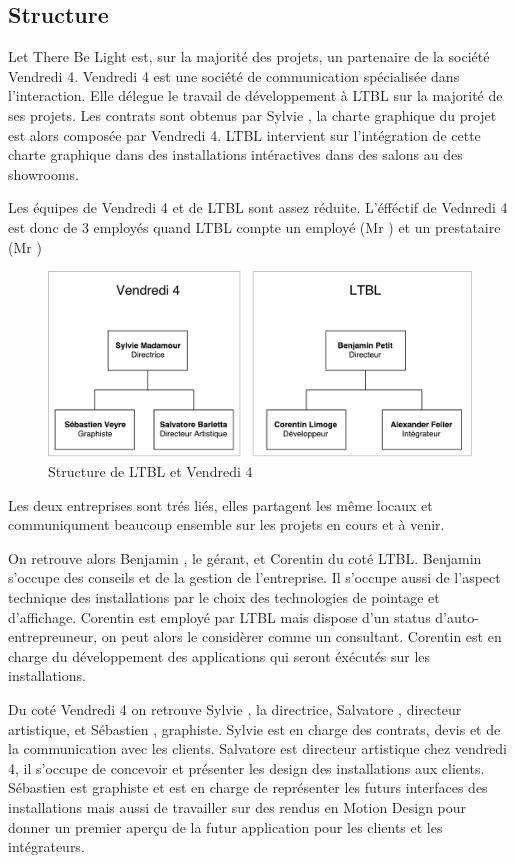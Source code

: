 \documentclass{article}
\begin{document}
\subsection{Structure}

Let There Be Light est, sur la majorité des projets, un partenaire de la société Vendredi 4.
Vendredi 4 est une société de communication spécialisée dans l'interaction.
Elle délegue le travail de développement à LTBL sur la majorité de ses projets.
Les contrats sont obtenus par Sylvie , la charte graphique du projet est alors composée par Vendredi 4.
LTBL intervient sur l'intégration de cette charte graphique dans des installations intéractives dans des salons au des showrooms.

Les équipes de Vendredi 4 et de LTBL sont assez réduite.
L'éfféctif de Vednredi 4 est donc de 3 employés quand LTBL compte un employé (Mr ) et un prestataire (Mr )

\begin{figure}[h]
    \centering
    \includegraphics[scale=0.7]{Structure-LTBL.pdf}
    \caption{Structure de LTBL et Vendredi 4}
\end{figure}

Les deux entreprises sont trés liés, elles partagent les même locaux et communiqument beaucoup ensemble sur les projets en cours et à venir.

On retrouve alors Benjamin , le gérant, et Corentin  du coté LTBL.
Benjamin s'occupe des conseils et de la gestion de l'entreprise.
Il s'occupe aussi de l'aspect technique des installations par le choix des technologies de pointage et d'affichage.
Corentin est employé par LTBL mais dispose d'un status d'auto-entrepreuneur, on peut alors le considèrer comme un consultant.
Corentin est en charge du développement des applications qui seront éxécutés sur les installations.

Du coté Vendredi 4 on retrouve Sylvie , la directrice, Salvatore , directeur artistique, et Sébastien , graphiste.
Sylvie est en charge des contrats, devis et de la communication avec les clients.
Salvatore est directeur artistique chez vendredi 4, il s'occupe de concevoir et présenter les design des installations aux clients.
Sébastien est graphiste et est en charge de représenter les futurs interfaces des installations mais aussi de travailler sur des rendus en Motion Design pour donner un premier aperçu de la futur application pour les clients et les intégrateurs.
\end{document}
